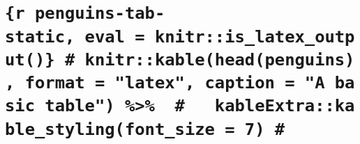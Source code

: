 \hypertarget{r-penguins-tab-static-eval-knitris_latex_output-knitrkableheadpenguins-format-latex-caption-a-basic-table-kableextrakable_stylingfont_size-7}{%
\section{\texorpdfstring{\texttt{\{r\ penguins-tab-static,\ eval\ =\ knitr::is\_latex\_output()\}\ \#\ knitr::kable(head(penguins),\ format\ =\ "latex",\ caption\ =\ "A\ basic\ table")\ \%\textgreater{}\%\ \ \#\ \ \ kableExtra::kable\_styling(font\_size\ =\ 7)\ \#}}{\{r penguins-tab-static, eval = knitr::is\_latex\_output()\} \# knitr::kable(head(penguins), format = "latex", caption = "A basic table") \%\textgreater\%  \#   kableExtra::kable\_styling(font\_size = 7) \#}}\label{r-penguins-tab-static-eval-knitris_latex_output-knitrkableheadpenguins-format-latex-caption-a-basic-table-kableextrakable_stylingfont_size-7}}

